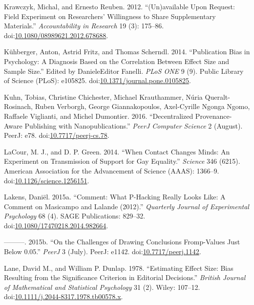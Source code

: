 \documentclass[a5paper]{book}
\begin{document}
\hypertarget{ref-doi:10.1080ux2f08989621.2012.678688}{}
Krawczyk, Michal, and Ernesto Reuben. 2012. ``(Un)available Upon
Request: Field Experiment on Researchers' Willingness to Share
Supplementary Materials.'' \emph{Accountability in Research} 19 (3):
175--86.
doi:\href{https://doi.org/10.1080/08989621.2012.678688}{10.1080/08989621.2012.678688}.

\hypertarget{ref-doi:10.1371ux2fjournal.pone.0105825}{}
Kühberger, Anton, Astrid Fritz, and Thomas Scherndl. 2014. ``Publication
Bias in Psychology: A Diagnosis Based on the Correlation Between Effect
Size and Sample Size.'' Edited by DanieleEditor Fanelli. \emph{PLoS ONE}
9 (9). Public Library of Science (PLoS): e105825.
doi:\href{https://doi.org/10.1371/journal.pone.0105825}{10.1371/journal.pone.0105825}.

\hypertarget{ref-doi:10.7717ux2fpeerj-cs.78}{}
Kuhn, Tobias, Christine Chichester, Michael Krauthammer, Núria
Queralt-Rosinach, Ruben Verborgh, George Giannakopoulos, Axel-Cyrille
Ngonga Ngomo, Raffaele Viglianti, and Michel Dumontier. 2016.
``Decentralized Provenance-Aware Publishing with Nanopublications.''
\emph{PeerJ Computer Science} 2 (August). PeerJ: e78.
doi:\href{https://doi.org/10.7717/peerj-cs.78}{10.7717/peerj-cs.78}.

\hypertarget{ref-doi:10.1126ux2fscience.1256151}{}
LaCour, M. J., and D. P. Green. 2014. ``When Contact Changes Minds: An
Experiment on Transmission of Support for Gay Equality.'' \emph{Science}
346 (6215). American Association for the Advancement of Science (AAAS):
1366--9.
doi:\href{https://doi.org/10.1126/science.1256151}{10.1126/science.1256151}.

\hypertarget{ref-doi:10.1080ux2f17470218.2014.982664}{}
Lakens, Daniël. 2015a. ``Comment: What P-Hacking Really Looks Like: A
Comment on Masicampo and Lalande (2012).'' \emph{Quarterly Journal of
Experimental Psychology} 68 (4). SAGE Publications: 829--32.
doi:\href{https://doi.org/10.1080/17470218.2014.982664}{10.1080/17470218.2014.982664}.

\hypertarget{ref-doi:10.7717ux2fpeerj.1142}{}
---------. 2015b. ``On the Challenges of Drawing Conclusions
Fromp-Values Just Below 0.05.'' \emph{PeerJ} 3 (July). PeerJ: e1142.
doi:\href{https://doi.org/10.7717/peerj.1142}{10.7717/peerj.1142}.

\hypertarget{ref-doi:10.1111ux2fj.2044-8317.1978.tb00578.x}{}
Lane, David M., and William P. Dunlap. 1978. ``Estimating Effect Size:
Bias Resulting from the Significance Criterion in Editorial Decisions.''
\emph{British Journal of Mathematical and Statistical Psychology} 31
(2). Wiley: 107--12.
doi:\href{https://doi.org/10.1111/j.2044-8317.1978.tb00578.x}{10.1111/j.2044-8317.1978.tb00578.x}.
\end{document}
